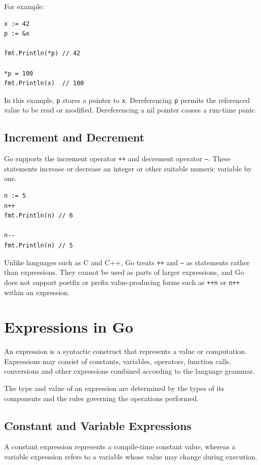 For example:

\begin{lstlisting}
x := 42
p := &x

fmt.Println(*p) // 42

*p = 100
fmt.Println(x)  // 100
\end{lstlisting}

In this example, \texttt{p} stores a pointer to \texttt{x}.
Dereferencing \texttt{p} permits the referenced value to be
read or modified. Dereferencing a nil pointer causes a
run-time panic.

\subsection{Increment and Decrement}

Go supports the increment operator \texttt{++} and decrement
operator \texttt{--}. These statements increase or decrease
an integer or other suitable numeric variable by one.

\begin{lstlisting}
n := 5
n++
fmt.Println(n) // 6

n--
fmt.Println(n) // 5
\end{lstlisting}

Unlike languages such as C and C++, Go treats \texttt{++} and
\texttt{--} as statements rather than expressions. They cannot
be used as parts of larger expressions, and Go does not
support postfix or prefix value-producing forms such as
\texttt{++n} or \texttt{n++} within an expression.

\section{Expressions in Go}

An expression is a syntactic construct that represents a value
or computation. Expressions may consist of constants,
variables, operators, function calls, conversions and other
expressions combined according to the language grammar.

The type and value of an expression are determined by the
types of its components and the rules governing the operations
performed.

\subsection{Constant and Variable Expressions}

A constant expression represents a compile-time constant
value, whereas a variable expression refers to a variable
whose value may change during execution.

